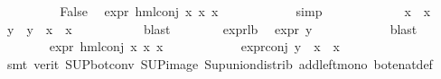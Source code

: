 \begin{isabellebody}
\ \ \ \ \ \ \isamarkupfalse%
\ \isamarkupfalse%
\ False\ \isamarkupfalse%
\ {\isacartoucheopen}expr{\isacharunderscore}{\kern0pt}{}\ {\isacharparenleft}{\kern0pt}hml{\isacharunderscore}{\kern0pt}conj\ x{}{}\ x{}{}\ x{}{}{\isacharparenright}{\kern0pt}\ {\isasymle}\ {}{\isacartoucheclose}\isanewline
\ \ \ \ \ \ \ \ \isamarkupfalse%
\ simp\isanewline
\ \ \ \ \isamarkupfalse%
\isanewline
\ \ \ \ \ \ \isamarkupfalse%
\ {\isachardoublequoteopen}x{}{}\ {\isacharbackquote}{\kern0pt}\ x{}{}\ {\isasymnoteq}\ {\isacharbraceleft}{\kern0pt}{\isacharbraceright}{\kern0pt}{\isachardoublequoteclose}\isanewline
{}\isamarkupfalse%
\ \isamarkupfalse%
\ y\ \ {\isachardoublequoteopen}y\ {\isasymin}\ {\isacharparenleft}{\kern0pt}x{}{}\ {\isacharbackquote}{\kern0pt}\ x{}{}{\isacharparenright}{\kern0pt}{\isachardoublequoteclose}\ \isanewline
\ \ \ \ \ \ \ \ \isamarkupfalse%
\ blast\isanewline
\ \ \ \ \ \ \isamarkupfalse%
\ expr{\isacharunderscore}{\kern0pt}{}{\isacharunderscore}{\kern0pt}lb\ \isamarkupfalse%
\ {\isachardoublequoteopen}expr{\isacharunderscore}{\kern0pt}{}\ y\ {\isasymge}\ {}{\isachardoublequoteclose}\isanewline
\ \ \ \ \ \ \ \ \isamarkupfalse%
\ blast\isanewline
\ \ \ \ \ \ \isamarkupfalse%
\ {\isachardoublequoteopen}expr{\isacharunderscore}{\kern0pt}{}\ {\isacharparenleft}{\kern0pt}hml{\isacharunderscore}{\kern0pt}conj\ x{}{}\ x{}{}\ x{}{}{\isacharparenright}{\kern0pt}\ {\isasymge}\ {}{\isachardoublequoteclose}\isanewline
\ \ \ \ \ \ \ \ \isamarkupfalse%
\ expr{\isacharunderscore}{\kern0pt}{}{\isacharunderscore}{\kern0pt}conj\ {\isacartoucheopen}y\ {\isasymin}\ {\isacharparenleft}{\kern0pt}x{}{}\ {\isacharbackquote}{\kern0pt}\ x{}{}{\isacharparenright}{\kern0pt}{\isacartoucheclose}\ \isanewline
\ \ \ \ \ \ \ \ \isamarkupfalse%
\ {\isacharparenleft}{\kern0pt}smt\ {\isacharparenleft}{\kern0pt}verit{\isacharparenright}{\kern0pt}\ SUP{\isacharunderscore}{\kern0pt}bot{\isacharunderscore}{\kern0pt}conv{\isacharparenleft}{\kern0pt}{}{\isacharparenright}{\kern0pt}\ SUP{\isacharunderscore}{\kern0pt}image\ Sup{\isacharunderscore}{\kern0pt}union{\isacharunderscore}{\kern0pt}distrib\ add{\isacharunderscore}{\kern0pt}left{\isacharunderscore}{\kern0pt}mono\ bot{\isacharunderscore}{\kern0pt}enat{\isacharunderscore}{\kern0pt}def\ \isanewline

\end{isabellebody}
